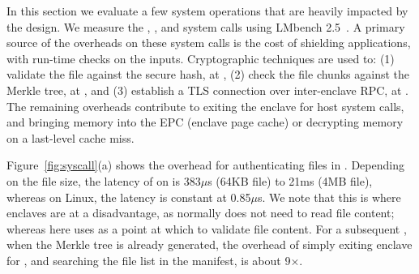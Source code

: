 In this section we evaluate a few system operations that are heavily impacted by the \graphenesgx{} design.
We measure the , , and  system calls
using LMbench 2.5~\cite{McVoy:lmbench}.
A primary source of the overheads on these system calls is the cost of shielding applications, with run-time checks on the inputs.
Cryptographic techniques are used to: (1) validate the file against the secure hash, at , (2) check the file chunks against the Merkle tree, at , and (3) establish a TLS connection over inter-enclave RPC, at .
The remaining overheads contribute to exiting the enclave for host system calls, and bringing memory into the EPC (enclave page cache) or decrypting 
memory on a last-level cache miss. %


Figure~\ref{fig:syscall}(a)
shows the overhead for authenticating files in .
Depending on the file size, the latency of  on \graphenesgx{} is 383$\mu$s (64KB file) to 21ms (4MB file), whereas on Linux, the latency is constant at 0.85$\mu$s.
We note that this is where enclaves are at a disadvantage, as  
normally does not need to read file content; whereas here \graphenesgx{} uses 
as a point at which to validate file content.
For a subsequent , when the Merkle tree is already generated, the overhead of simply exiting enclave for , and searching the file list in the manifest, is about 9$\times$.


